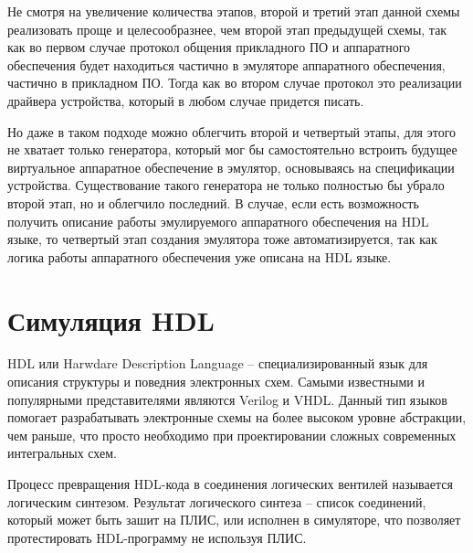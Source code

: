 
Не смотря на увеличение количества этапов, второй и третий этап данной схемы реализовать проще и
целесообразнее, чем второй этап предыдущей схемы, так как во первом случае
протокол общения прикладного ПО и аппаратного обеспечения будет находиться частично в
эмуляторе аппаратного обеспечения, частично в прикладном ПО.
Тогда как во втором случае протокол это реализации драйвера устройства, который в любом случае придется писать.

Но даже в таком подходе можно облегчить второй и четвертый этапы, для этого не хватает только
генератора, который мог бы самостоятельно встроить будущее виртуальное аппаратное обеспечение
в эмулятор, основываясь на спецификации устройства.
Существование такого генератора не только полностью бы убрало второй этап, но и облегчило последний.
В случае, если есть возможность получить описание работы эмулируемого аппаратного обеспечения на HDL языке,
то четвертый этап создания эмулятора тоже автоматизируется, так как логика работы аппаратного обеспечения
уже описана на HDL языке.


\section{Симуляция HDL}\label{sec:ch1/sec3}

HDL или Harwdare Description Language -- специализированный язык для описания структуры и поведния
электронных схем. Самыми известными и популярными представителями являются Verilog и VHDL.
Данный тип языков помогает разрабатывать электронные схемы на более высоком уровне абстракции, чем раньше,
что просто необходимо при проектировании сложных современных интегральных схем.

Процесс превращения HDL-кода в соединения логических вентилей называется логическим синтезом.
Результат логического синтеза -- список соединений, который может быть зашит на ПЛИС, или исполнен в симуляторе, что позволяет
протестировать HDL-программу не используя ПЛИС.

